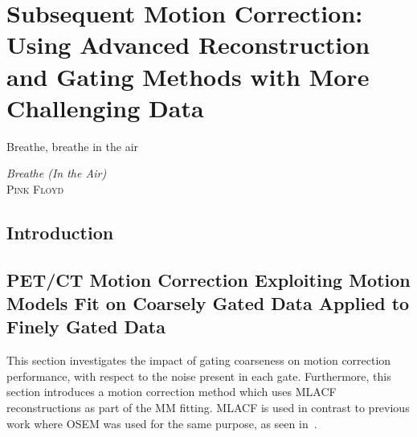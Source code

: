 \chapter{Subsequent Motion Correction: Using Advanced Reconstruction and Gating Methods with More Challenging Data} \label{sec:subsequent_motion_correction_using_advanced_reconstruction_and_gating_methods_with_more_challenging_data}
    \vspace*{\fill}
    \setlength{\epigraphwidth}{0.3\linewidth}
    \renewcommand{\epigraphflush}{flushright}
    \renewcommand{\epigraphsize}{\footnotesize}
    \epigraph{Breathe, breathe in the air}%
              {\textit{Breathe (In the Air)}\\ \textsc{Pink Floyd}}
    
    \newpage
    
    \section{Introduction} \label{sec:subsequent_motion_correction_using_advanced_reconstruction_and_gating_methods_with_more_challenging_data_introduction}
        
    
    \section{PET/CT Motion Correction Exploiting Motion Models Fit on Coarsely Gated Data Applied to Finely Gated Data} \label{sec:pet_ct_motion_correction_exploiting_motion_models_fit_on_coarsely_gated_data_applied_to_finely_gated_data}
        This section investigates the impact of gating coarseness on motion correction performance, with respect to the noise present in each gate. Furthermore, this section introduces a motion correction method which uses \gls{MLACF} reconstructions as part of the \gls{MM} fitting. \gls{MLACF} is used in contrast to previous work where \gls{OSEM} was used for the same purpose, as seen in~.

